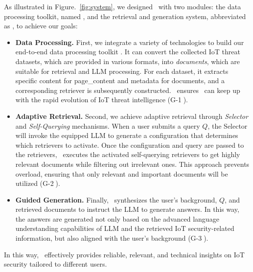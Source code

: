 As illustrated in Figure.~\ref{fig:system}, we designed \chatiot\ with two modules: the data processing toolkit, named \datakit, and the retrieval and generation system, abbreviated as \iotrgen, to achieve our goals:

\begin{itemize}
\item \textbf{Data Processing.} First, we integrate a variety of technologies to build our end-to-end data processing toolkit \datakit.
It can convert the collected IoT threat datasets, which are provided in various formats, into \textit{documents}, which are suitable for retrieval and LLM processing.
For each dataset, it extracts specific content for page\_content and metadata for documents, and a corresponding retriever is subsequently constructed.
\datakit\ ensures \chatiot\ can keep up with the rapid evolution of IoT threat intelligence (G-\textcircled{1}).

\item \textbf{Adaptive Retrieval.} Second, we achieve adaptive retrieval through \textit{Selector} and \textit{Self-Querying} mechanisms.
When a user submits a query $Q$, the Selector will invoke the equipped LLM to generate a configuration that determines which retrievers to activate. 
Once the configuration and query are passed to the retrievers, \iotrgen\ executes the activated self-querying retrievers to get highly relevant documents while filtering out irrelevant ones. 
This approach prevents overload, ensuring that only relevant and important documents will be utilized (G-\textcircled{2}).

\item \textbf{Guided Generation.} Finally, \iotrgen\ synthesizes the user’s background, $Q$, and retrieved documents to instruct the LLM to generate answers.
In this way, the answers are generated not only based on the advanced language understanding capabilities of LLM and the retrieved IoT security-related information, but also aligned with the user's background (G-\textcircled{3}).

\end{itemize}

In this way, \chatiot\ effectively provides reliable, relevant, and technical insights on IoT security tailored to different users.


